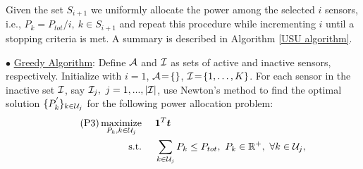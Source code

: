 \documentclass[conference]{IEEEtran}
\begin{document}
%
Given the set $S_{i+1}$ we uniformly allocate the power among the selected $i$ sensors, i.e., $P_k=P_{tot}/i,\ k\in S_{i+1}$ and repeat this procedure while incrementing $i$ until a stopping criteria is met. A summary is described in Algorithm \ref{USU algorithm}.\\
\begin{comment}
which is given as:
%
\begin{align} \tag{P2}\label{Boolean relaxed problem}
\mathop{\text{maximize}}_{P_k, w_k\forall k}\ \ \ \ &\sum_{k=1}^{K}w_kt_k(P_k)\nonumber\\
\text{s.t.}\ \ \ \ &\sum_{k=1}^{K}P_k\leq P_{tot},\ P_k\in \mathbb{R}^{+},\ \forall k\nonumber\\
&w_k\in [0,1],\ \forall k\nonumber
\end{align}
%
We propose two algorithms to solve \eqref{Boolean relaxed problem}: 1) USU, 2) greedy. 
%
%

1) {\bf USU}: It is described in Algorithm 1.
\end{comment}
$\bullet$ \underline{Greedy Algorithm}:
Define ${\cal A}$ and ${\cal I}$ as sets of active and inactive sensors, respectively. Initialize with $i=1$, ${\cal A}\!=\!\{\}$, ${\cal I}\!=\!\{1, \dots, K\}$. For each sensor in the inactive set ${\cal I}$, say ${\cal I}_j,\ j=1, ..., |{\cal I}|$, use Newton's method to find the optimal solution $\{P^{'}_k\}_{k\in {\cal U}_j}$ for the following power allocation problem:
 \begin{align*} \tag{P3}\label{max tr(J) for k in U_j}
 \mathop{\text{maximize}}_{P_k,k\in {\cal U}_j}\ \ \ \ &\boldsymbol{1}^T\boldsymbol{t}\nonumber\\
 \text{s.t.}\ \ \ \ &\sum_{k\in {\cal U}_j}P_k\leq P_{tot},\ P_k\in \mathbb{R}^{+},\ \forall k\in {\cal U}_j,
 \end{align*}
\end{document}
